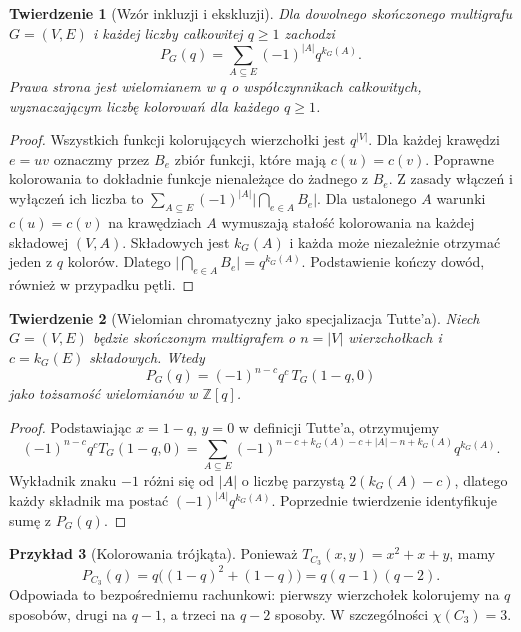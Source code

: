 \documentclass[11pt,a4paper]{report}
\numberwithin{equation}{section}
\theoremstyle{plain}
\newtheorem{twierdzenie}{Twierdzenie}[section]
\theoremstyle{definition}
\newtheorem{przyklad}[twierdzenie]{Przykład}
\theoremstyle{remark}
\begin{document}
\begin{twierdzenie}[Wzór inkluzji i ekskluzji]
\label{thm:tg-chromatic-inclusion}
Dla dowolnego skończonego multigrafu $G=(V,E)$ i każdej
liczby całkowitej $q\ge1$ zachodzi
\[
 P_G(q)=\sum_{A\subseteq E}(-1)^{|A|}q^{k_G(A)}.
\]
Prawa strona jest wielomianem w $q$ o współczynnikach
całkowitych, wyznaczającym liczbę kolorowań dla każdego $q\ge1$.
\end{twierdzenie}

\begin{proof}
Wszystkich funkcji kolorujących wierzchołki jest $q^{|V|}$.
Dla każdej krawędzi $e=uv$ oznaczmy przez $B_e$
zbiór funkcji, które mają $c(u)=c(v)$.
Poprawne kolorowania to dokładnie funkcje nienależące
do żadnego z $B_e$. Z zasady włączeń i wyłączeń ich liczba
to $\sum_{A\subseteq E}(-1)^{|A|}\bigl|\bigcap_{e\in A}B_e\bigr|$.
Dla ustalonego $A$ warunki $c(u)=c(v)$ na krawędziach $A$
wymuszają stałość kolorowania na każdej składowej $(V,A)$.
Składowych jest $k_G(A)$ i każda może niezależnie otrzymać
jeden z $q$ kolorów. Dlatego
$\bigl|\bigcap_{e\in A}B_e\bigr|=q^{k_G(A)}$.
Podstawienie kończy dowód, również w przypadku pętli.
\end{proof}

\begin{twierdzenie}[Wielomian chromatyczny jako specjalizacja Tutte'a]
\label{thm:tg-chrom-tutte}
Niech $G=(V,E)$ będzie skończonym multigrafem o $n=|V|$
wierzchołkach i $c=k_G(E)$ składowych. Wtedy
\[
P_G(q)=(-1)^{n-c}q^c\,T_G(1-q,0)
\]
jako tożsamość wielomianów w $\mathbb Z[q]$.
\end{twierdzenie}

\begin{proof}
Podstawiając $x=1-q$, $y=0$ w definicji Tutte'a,
otrzymujemy
\[
(-1)^{n-c}q^c T_G(1-q,0)
=\sum_{A\subseteq E}
 (-1)^{n-c+k_G(A)-c+|A|-n+k_G(A)}q^{k_G(A)}.
\]
Wykładnik znaku $-1$ różni się od $|A|$ o liczbę parzystą
$2(k_G(A)-c)$, dlatego każdy składnik ma postać
$(-1)^{|A|}q^{k_G(A)}$. Poprzednie twierdzenie
identyfikuje sumę z $P_G(q)$.
\end{proof}

\begin{przyklad}[Kolorowania trójkąta]
Ponieważ $T_{C_3}(x,y)=x^2+x+y$, mamy
\[
P_{C_3}(q)=q\bigl((1-q)^2+(1-q)\bigr)
=q(q-1)(q-2).
\]
Odpowiada to bezpośredniemu rachunkowi: pierwszy
wierzchołek kolorujemy na $q$ sposobów, drugi
na $q-1$, a trzeci na $q-2$ sposoby.
W szczególności $\chi(C_3)=3$.
\end{przyklad}
\end{document}
